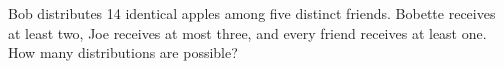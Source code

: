 Bob distributes 14 identical apples among five distinct friends. Bobette receives at least two, Joe receives at most three, and every friend receives at least one. How many distributions are possible?
